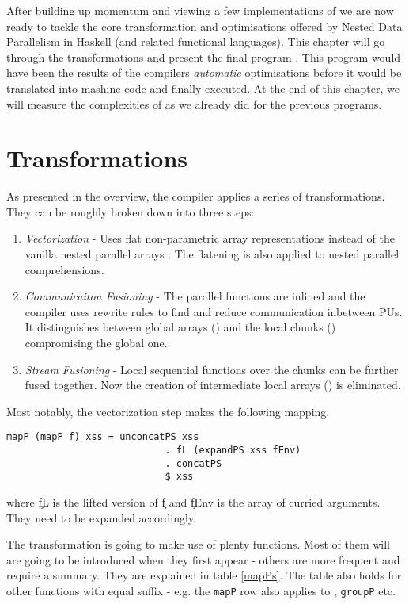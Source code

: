 

  After building up momentum and viewing a few implementations of \algo
  we are now ready to tackle the core transformation and optimisations
  offered by Nested Data Parallelism in Haskell (and related functional languages).
  This chapter will go through the transformations and present the
  final program \ndpv. This program would have been the results of the compilers \textit{automatic}
  optimisations before it would be translated into mashine code and finally executed.
  At the end of this chapter, we will measure the complexities of \ndpv as we already did for the previous programs.
  
  \section{Transformations}
    As presented in the overview, the compiler applies a series of transformations. They can be
    roughly broken down into three steps:
    \begin{enumerate}
      \item \emph{Vectorization} - Uses flat non-parametric array \pav representations instead of the
            vanilla nested parallel arrays \pan . The flatening is also applied to nested parallel comprehensions.
      \item \emph{Communicaiton Fusioning} - The parallel functions are inlined and the compiler uses rewrite rules to
            find and reduce communication inbetween PUs. It distinguishes between global arrays (\pav) and the local chunks (\pad)
            compromising the global one.
      \item \emph{Stream Fusioning} - Local sequential functions over the chunks can be further fused together. Now
            the creation of intermediate local arrays (\pad) is eliminated.
    \end{enumerate}
    
    Most notably, the vectorization step makes the following mapping.
    \begin{lstlisting}
mapP (mapP f) xss = unconcatPS xss
                            . fL (expandPS xss fEnv)
                            . concatPS
                            $ xss
    \end{lstlisting}
    where \c{fL} is the lifted version of \c{f} and \c{fEnv} is
    the array of curried arguments. They need to be expanded accordingly.
    
    The transformation is going to make use of plenty functions. Most of them will are going to be
    introduced when they first appear - others are more frequent and require a summary. They are explained in table \ref{mapPs}.
    The table also holds for other functions with equal suffix - e.g. the \texttt{mapP} row also applies to , \texttt{groupP} etc.
    
